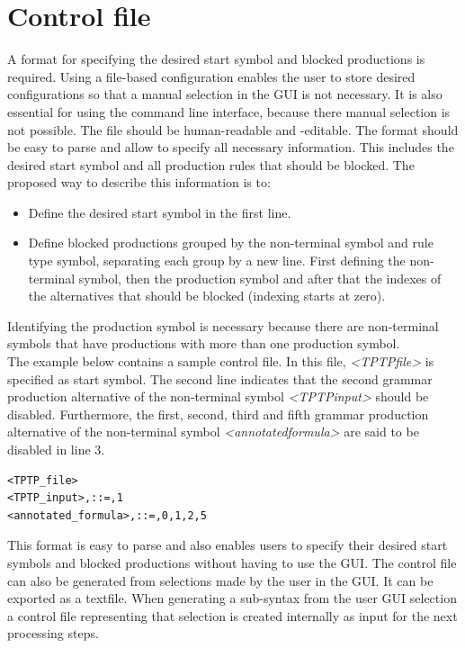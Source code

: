 \section{Control file}\label{sec:ConceptControlFile}
A format for specifying the desired start symbol and blocked productions is required.
Using a file-based configuration enables the user to store desired configurations so that a manual selection in the GUI is not necessary.
It is also essential for using the command line interface, because there manual selection is not possible.
The file should be human-readable and -editable.
The format should be easy to parse and allow to specify all necessary information.
This includes the desired start symbol and all production rules that should be blocked.
The proposed way to describe this information is to:

\begin{itemize}%
	\item Define the desired start symbol in the first line.
	\item Define blocked productions grouped by the non-terminal symbol and rule type symbol, separating each group by a new line.
	First defining the non-terminal symbol, then the production symbol and after that the indexes of the alternatives that should be blocked (indexing starts at zero).
\end{itemize}
Identifying the production symbol is necessary because there are non-terminal symbols that have productions with more than one production symbol.\\
The example below contains a sample control file.
In this file,  \textit{\textless TPTP\textunderscore file\textgreater} is specified as start symbol.
The second line indicates that the second grammar production alternative of the non-terminal symbol \textit{\textless TPTP\textunderscore input\textgreater} should be disabled.
Furthermore, the first, second, third and fifth grammar production alternative of the non-terminal symbol \textit{\textless annotated\textunderscore formula\textgreater} are said to be disabled in line 3.

\begin{lstlisting}[caption= Control file,label= lst:ConceptControlFile]
<TPTP_file>
<TPTP_input>,::=,1
<annotated_formula>,::=,0,1,2,5
\end{lstlisting}
This format is easy to parse and also enables users to specify their desired start symbols and blocked productions without having to use the GUI. The control file can also be generated from selections made by the user in the GUI.
It can be exported as a textfile.
When generating a sub-syntax from the user GUI selection a control file representing that selection is created internally as input for the next processing steps.

